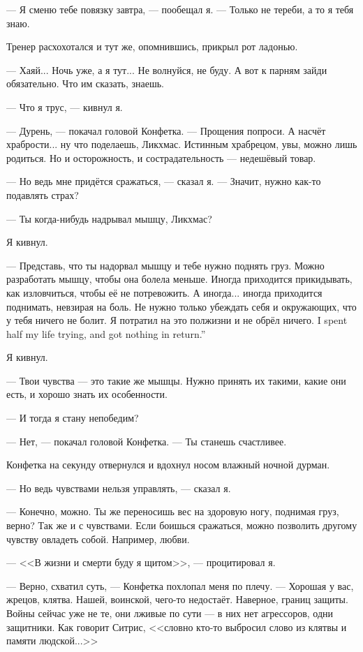 --- Я сменю тебе повязку завтра, --- пообещал я.
--- Только не тереби, а то я тебя знаю.

Тренер расхохотался и тут же, опомнившись, прикрыл рот ладонью.

--- Хаяй...
Ночь уже, а я тут...
Не волнуйся, не буду.
А вот к парням зайди обязательно.
Что им сказать, знаешь.

--- Что я трус, --- кивнул я.

--- Дурень, --- покачал головой Конфетка.
--- Прощения попроси.
А насчёт храбрости... ну что поделаешь, Ликхмас.
Истинным храбрецом, увы, можно лишь родиться.
Но и осторожность, и сострадательность --- недешёвый товар.

--- Но ведь мне придётся сражаться, --- сказал я.
--- Значит, нужно как-то подавлять страх?

--- Ты когда-нибудь надрывал мышцу, Ликхмас?

Я кивнул.

--- Представь, что ты надорвал мышцу и тебе нужно поднять груз.
Можно разработать мышцу, чтобы она болела меньше.
Иногда приходится прикидывать, как изловчиться, чтобы её не потревожить.
А иногда... иногда приходится поднимать, невзирая на боль.
Не нужно только убеждать себя и окружающих, что у тебя ничего не болит.
{Я потратил на это полжизни и не обрёл ничего.}
{I spent half my life trying, and got nothing in return.''}

Я кивнул.

--- Твои чувства --- это такие же мышцы.
Нужно принять их такими, какие они есть, и хорошо знать их особенности.

--- И тогда я стану непобедим?

--- Нет, --- покачал головой Конфетка.
--- Ты станешь счастливее.

Конфетка на секунду отвернулся и вдохнул носом влажный ночной дурман.

--- Но ведь чувствами нельзя управлять, --- сказал я.

--- Конечно, можно.
Ты же переносишь вес на здоровую ногу, поднимая груз, верно?
Так же и с чувствами.
Если боишься сражаться, можно позволить другому чувству овладеть собой.
Например, любви.

--- <<В жизни и смерти буду я щитом>>, --- процитировал я.

--- Верно, схватил суть, --- Конфетка похлопал меня по плечу.
--- Хорошая у вас, жрецов, клятва.
Нашей, воинской, чего-то недостаёт.
Наверное, границ защиты.
Войны сейчас уже не те, они лживые по сути --- в них нет агрессоров, одни защитники.
Как говорит Ситрис, <<словно кто-то выбросил слово из клятвы и памяти людской...>>\FM\

